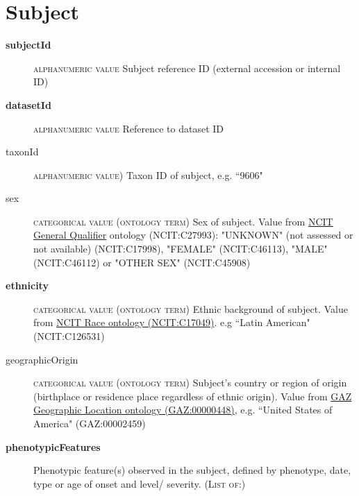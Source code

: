 \documentclass[a4paper, 10pt]{article}        %
\begin{document}
\section*{{\color{teal} Subject}}
\begin{description}
	\item[\textbf{subjectId}]  {\textsc{alphanumeric value}} Subject reference ID (external accession or internal ID)
	\item[\textbf{datasetId}] {\textsc{alphanumeric value}} Reference to dataset ID 
	\item[taxonId] {\textsc{alphanumeric value)}} Taxon ID of subject, e.g. ``9606"
	\item[sex] {\textsc{categorical value (ontology term)}} Sex of subject. Value from \href{https://www.ebi.ac.uk/ols/ontologies/ncit/terms?iri=http%3A%2F%2Fpurl.obolibrary.org%2Fobo%2FNCIT_C27993&viewMode=All&siblings=false}{NCIT General Qualifier} ontology (NCIT:C27993): "UNKNOWN" (not assessed or not available) (NCIT:C17998), "FEMALE" (NCIT:C46113), "MALE" (NCIT:C46112) or "OTHER SEX" (NCIT:C45908)
	\item[\textbf{ethnicity}] {\textsc{categorical value (ontology term)}} Ethnic background of subject. Value from \href{https://www.ebi.ac.uk/ols/ontologies/ncit/terms?iri=http%3A%2F%2Fpurl.obolibrary.org%2Fobo%2FNCIT_C17049}{NCIT Race ontology (NCIT:C17049)}. e.g ``Latin American" (NCIT:C126531)
	\item[geographicOrigin] {\textsc{categorical value (ontology term)}} Subject's country or region of origin (birthplace or residence place regardless of ethnic origin). Value from \href{https://www.ebi.ac.uk/ols/ontologies/gaz/terms?iri=http%3A%2F%2Fpurl.obolibrary.org%2Fobo%2FGAZ_00000448}{GAZ Geographic Location ontology (GAZ:00000448)}, e.g. ``United States of America" (GAZ:00002459)
	\item[\textbf{phenotypicFeatures}] Phenotypic feature(s) observed in the subject, defined by phenotype, date, type or age of onset and level/ severity. {\textsc{(List of:)}}

\end{description}
\end{document}
